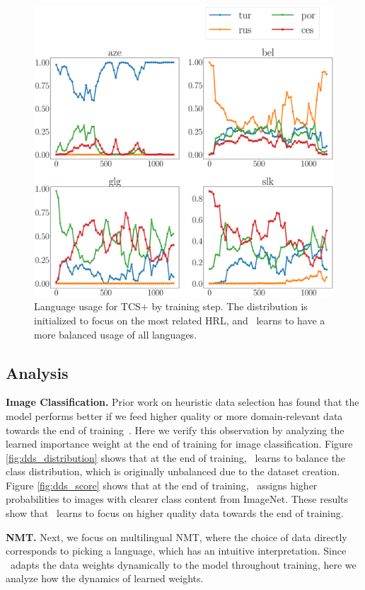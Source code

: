 \begin{figure}
    \centering
    \includegraphics[width=0.9\columnwidth]{figs/hs_prob_plot.eps}
    \caption{\label{fig:nmt_distrib_hs}Language usage for TCS$+$\dds{} by training step. The distribution is initialized to focus on the most related HRL, and \dds~learns to have a more balanced usage of all languages.}
\end{figure}

\subsection{Analysis}


\textbf{Image Classification.} Prior work on heuristic data selection has found that the model performs better if we feed higher quality or more domain-relevant data  towards the end of training~\citep{dynamic_data_selection_nmt,dynamic}. Here we verify this observation by analyzing the learned importance weight at the end of training for image classification. Figure \ref{fig:dds_distribution} shows that at the end of training, \dds~learns to balance the class distribution, which is originally unbalanced due to the dataset creation. Figure \ref{fig:dds_score} shows that at the end of training, \dds~assigns higher probabilities to images with clearer class content from ImageNet. These results show that \dds~learns to focus on higher quality data towards the end of training.  


\textbf{NMT.}
Next, we focus on multilingual NMT, where the choice of data directly corresponds to picking a language, which has an intuitive interpretation. Since \dds~adapts the data weights dynamically to the model throughout training, here we analyze how the dynamics of learned weights.


